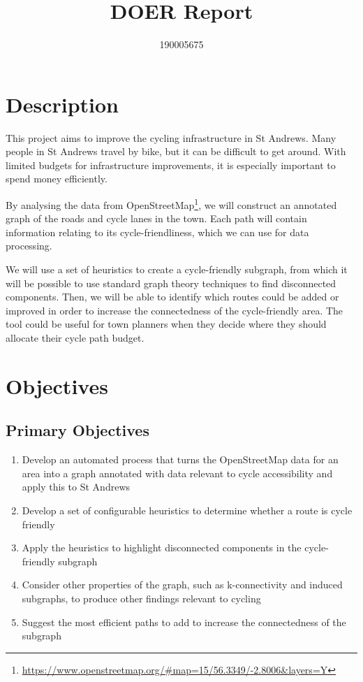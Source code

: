 \documentclass{article}
\title{DOER Report}
\author{190005675}
\date{}
\begin{document}
\maketitle

\section{Description}
This project aims to improve the cycling infrastructure in St Andrews. Many people in St Andrews travel by bike, but it can be difficult to get around. With limited budgets for infrastructure improvements, it is especially important to spend money efficiently.

By analysing the data from OpenStreetMap\footnote{\url{https://www.openstreetmap.org/#map=15/56.3349/-2.8006&layers=Y}}, we will construct an annotated graph of the roads and cycle lanes in the town. Each path will contain information relating to its cycle-friendliness, which we can use for data processing.

We will use a set of heuristics to create a cycle-friendly subgraph, from which it will be possible to use standard graph theory techniques to find disconnected components. Then, we will be able to identify which routes could be added or improved in order to increase the connectedness of the cycle-friendly area. The tool could be useful for town planners when they decide where they should allocate their cycle path budget.

\section{Objectives}

\subsection{Primary Objectives}
\begin{enumerate}
    \item Develop an automated process that turns the OpenStreetMap data for an area into a graph annotated with data relevant to cycle accessibility and apply this to St Andrews
    \item Develop a set of configurable heuristics to determine whether a route is cycle friendly
    \item Apply the heuristics to highlight disconnected components in the cycle-friendly subgraph
    \item Consider other properties of the graph, such as k-connectivity and induced subgraphs, to produce other findings relevant to cycling
    \item Suggest the most efficient paths to add to increase the connectedness of the subgraph
\end{enumerate}
\end{document}
